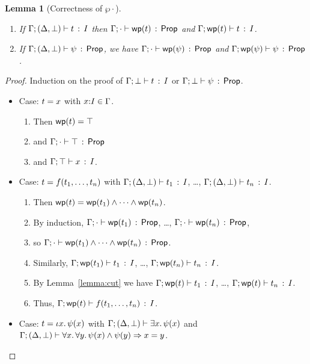 \documentclass[11pt]{article}
\newtheorem{lemma}{Lemma}
\begin{document}
\begin{lemma}[Correctness of $\wp{\cdot}$]
\mbox{}
  \begin{enumerate}
  \item If $\Gamma;(\Delta,\bot) \vdash t\, :\, I$ then
    $\Gamma;\cdot \vdash \mathop{\mathsf{wp}}(t)\, :\, \mathsf{Prop}$ and
    $\Gamma;\mathop{\mathsf{wp}}(t) \vdash t\, :\, I$.
  \item If $\Gamma;(\Delta,\bot) \vdash \psi\, :\, \mathsf{Prop}$, we have
    $\Gamma;\cdot \vdash \mathop{\mathsf{wp}}(\psi)\, :\, \mathsf{Prop}$ and $\Gamma;\mathop{\mathsf{wp}}(\psi) \vdash \psi\, :\, \mathsf{Prop}$.
  \end{enumerate}
\end{lemma}

\begin{proof}
  \raggedright Induction on the proof of
  $\Gamma;\bot \vdash t\, :\, I$ or $\Gamma;\bot \vdash \psi\, :\, \mathsf{Prop}$.
  \begin{itemize}
  \item Case: $t = x$ with $x{:}I\in\Gamma$.  
    \begin{enumerate}
      \item
        Then $\mathop{\mathsf{wp}}(t) = \top$ 
      \item
        and $\Gamma;\cdot \vdash \top\, :\, \mathsf{Prop}$ 
      \item
        and $\Gamma;\top \vdash x\, :\, I$.
      \end{enumerate}
  \item Case: $t = f({t}_1,\ldots,{t}_{n})$ with
    $\Gamma;(\Delta,\bot) \vdash t_1\, :\, I$, \ldots,
    $\Gamma;(\Delta,\bot) \vdash t_n\, :\, I$. 
    \begin{enumerate}
    \item
      Then $\mathop{\mathsf{wp}}(t) =
      \mathop{\mathsf{wp}}(t_1) \wedge \cdots \wedge \mathop{\mathsf{wp}}(t_n)$.  
    \item 
    	By induction,
      $\Gamma;\cdot \vdash \mathop{\mathsf{wp}}(t_1)\, :\, \mathsf{Prop}$, \ldots,
    $\Gamma;\cdot \vdash \mathop{\mathsf{wp}}(t_n)\, :\, \mathsf{Prop}$, 
    \item 
    	so
    $\Gamma;\cdot \vdash \mathop{\mathsf{wp}}(t_1) \wedge \cdots \wedge \mathop{\mathsf{wp}}(t_n)\, :\, \mathsf{Prop}$.
    \item 
    Similarly, $\Gamma;\mathop{\mathsf{wp}}(t_1) \vdash t_1\, :\, I$, \ldots,
    $\Gamma;\mathop{\mathsf{wp}}(t_n) \vdash t_n\, :\, I$.  
    \item
      By Lemma~\ref{lemma:cut} we have
      $\Gamma;\mathop{\mathsf{wp}}(t) \vdash t_1\, :\, I$, \ldots,
      $\Gamma;\mathop{\mathsf{wp}}(t) \vdash t_n\, :\, I$.  
    \item Thus,
      $\Gamma;\mathop{\mathsf{wp}}(t) \vdash f({t}_1,\ldots,{t}_{n})\, :\, I$.  
    \end{enumerate}
  \item Case: $t = \iota x.\, \psi(x)$ with
  $\Gamma;(\Delta,\bot) \vdash \exists x.\, \psi(x)$ and 
  $\Gamma;(\Delta,\bot) \vdash \forall x.\, \forall y.\, \psi(x) \wedge \psi(y) \Rightarrow x=y$.


\end{itemize}
\end{proof}
\end{document}
